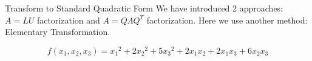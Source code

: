 \documentclass{beamer}
\begin{document}
\begin{frame}{Transform to Standard Quadratic Form}
We have introduced 2 approaches: $A=LU$ factorization and $A=Q\varLambda Q^T$ factorization. Here we use another method: Elementary Transformation.
\end{frame}
\begin{equation*}
    f\left( x_1, x_2, x_3 \right) ={x_1}^2+2{x_2}^2+5{x_3}^2+2x_1x_2+2x_1x_3+6x_2x_3
\end{equation*}
\end{document}
